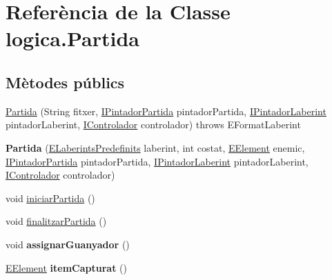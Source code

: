 \hypertarget{classlogica_1_1_partida}{\section{Referència de la Classe logica.\+Partida}
\label{classlogica_1_1_partida}
}
\subsection*{Mètodes públics}
\begin{DoxyCompactItemize}
\item 
\hyperlink{classlogica_1_1_partida_ab85633f290087fe7699fe41008b2e93a}{Partida} (String fitxer, \hyperlink{interfaceinterficie_1_1_i_pintador_partida}{I\+Pintador\+Partida} pintador\+Partida, \hyperlink{interfaceinterficie_1_1_i_pintador_laberint}{I\+Pintador\+Laberint} pintador\+Laberint, \hyperlink{interfacelogica_1_1controladors__pacman_1_1_i_controlador}{I\+Controlador} controlador)  throws E\+Format\+Laberint
\item 
\hypertarget{classlogica_1_1_partida_a89b9872f1db2660c1c0587d48ccef48c}{{\bfseries Partida} (\hyperlink{enumlogica_1_1enumeracions_1_1_e_laberints_predefinits}{E\+Laberints\+Predefinits} laberint, int costat, \hyperlink{enumlogica_1_1enumeracions_1_1_e_element}{E\+Element} enemic, \hyperlink{interfaceinterficie_1_1_i_pintador_partida}{I\+Pintador\+Partida} pintador\+Partida, \hyperlink{interfaceinterficie_1_1_i_pintador_laberint}{I\+Pintador\+Laberint} pintador\+Laberint, \hyperlink{interfacelogica_1_1controladors__pacman_1_1_i_controlador}{I\+Controlador} controlador)}\label{classlogica_1_1_partida_a89b9872f1db2660c1c0587d48ccef48c}

\item 
void \hyperlink{classlogica_1_1_partida_aa23f62dbeea7c44240304843e2ea699d}{iniciar\+Partida} ()
\item 
void \hyperlink{classlogica_1_1_partida_a44c3c25575052f971e90728f15f9c5a2}{finalitzar\+Partida} ()
\item 
\hypertarget{classlogica_1_1_partida_a29bd0292c22c67f4ada328373ec00d05}{void {\bfseries assignar\+Guanyador} ()}\label{classlogica_1_1_partida_a29bd0292c22c67f4ada328373ec00d05}

\item 
\hypertarget{classlogica_1_1_partida_a4f899f5e8cd1e5acc95321331aace206}{\hyperlink{enumlogica_1_1enumeracions_1_1_e_element}{E\+Element} {\bfseries item\+Capturat} ()}\label{classlogica_1_1_partida_a4f899f5e8cd1e5acc95321331aace206}


\end{DoxyCompactItemize}
